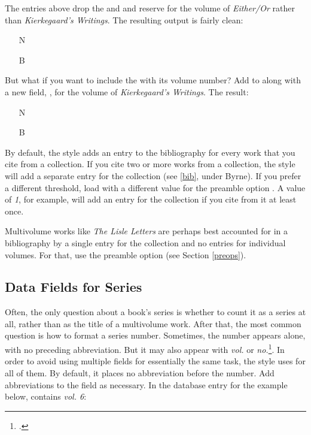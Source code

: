 \documentclass[11pt,letterpaper,oneside]{article}
\begin{document}
\noindent The entries above drop the  and
 and reserve  for the volume of
\textit{Either/Or} rather than \textit{Kierkegaard's Writings}. The
resulting output is fairly clean:

\begin{itemize}
\item[N] 

\item[B] 
\end{itemize}

But what if you want to include the  with its
volume number? Add  to  along
with a new field, , for the volume of
\textit{Kierkegaard's Writings}. The result:

\begin{itemize}
\item[N] 

\item[B] 
\end{itemize}

By default, the style adds an entry to the bibliography for every work
that you cite from a collection. If you cite two or more works from a
collection, the style will add a separate entry for the collection
(see \ref{bib}, under Byrne). If you prefer a different threshold,
load \biblatex with a different value for the preamble option
. A value of \textit{1}, for example, will add an
entry for the collection if you cite from it at least once.

Multivolume works like \textit{The Lisle Letters} are perhaps best
accounted for in a bibliography by a single entry for the collection
and no entries for individual volumes. For that, use the preamble
option  (see Section \ref{preops}).

\subsection{Data Fields for Series}

Often, the only question about a book's series is whether to count it
as a series at all, rather than as the title of a multivolume work.
After that, the most common question is how to format a series number.
Sometimes, the number appears alone, with no preceding abbreviation.
But it may also appear with \textit{vol.} or
\textit{no.}\footcite[\S\ref{14.128}. See also \S\ref{14.130} and
\S\ref{14.132}.]{chicago2010}. In order to avoid using multiple fields
for essentially the same task, the style uses  for
all of them. By default, it places no abbreviation before the number.
Add abbreviations to the field as necessary. In the database entry for
the example below,  contains \textit{vol. 6}:
\end{document}
